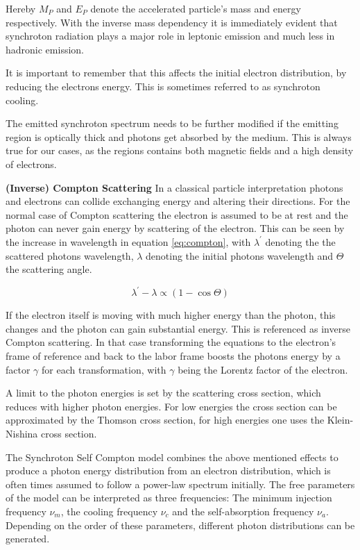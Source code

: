Hereby $M_P$ and $E_P$ denote the accelerated particle's 
mass and energy respectively. With the inverse mass dependency 
it is immediately evident that 
synchroton radiation plays a major role in leptonic 
emission and much less in hadronic emission.

It is important to remember that this affects the 
initial electron distribution, by reducing the electrons energy.
This is sometimes referred to as synchroton cooling.

The emitted synchroton spectrum needs to be further modified 
if the emitting region is optically thick and photons 
get absorbed by the medium.
This is always true for our cases, as the regions contains 
both magnetic fields and a high density of electrons.

\textbf{(Inverse) Compton Scattering}
In a classical particle interpretation photons and electrons 
can collide exchanging energy and altering their directions.
For the normal case of Compton scattering the electron 
is assumed to be at rest and the photon can never gain 
energy by scattering of the electron.
This can be 
seen by the increase in wavelength in equation \ref{eq:compton},
with $\lambda^{\prime}$ denoting the the scattered photons 
wavelength, $\lambda$ denoting the initial photons wavelength  
and $\Theta$ the scattering angle.

\begin{equation}
	\lambda^{\prime} - \lambda  \propto \left(1-\cos{\Theta} \right)
	\label{eq:compton}
\end{equation}


If the electron itself is moving with much higher energy
than the photon, this changes and the photon can gain substantial energy.
This is referenced as inverse Compton scattering.
In that case transforming the equations to the 
electron's frame of reference and back to the labor frame 
boosts the photons energy by a factor $\gamma$ for each transformation, 
with $\gamma$ being the Lorentz factor of the electron.

A limit to the photon energies is set by the scattering cross
section, which reduces with higher photon energies.
For low energies the cross section can be approximated by 
the Thomson cross section, for high energies
one uses the Klein-Nishina cross section.

The Synchroton Self Compton model combines the above mentioned
effects to produce a photon energy distribution from an
electron distribution, which is often times assumed to
follow a power-law spectrum initially.
The free parameters of the model can be interpreted as 
three frequencies: The minimum injection frequency $\nu_m$, 
the cooling frequency $\nu_c$ and the self-absorption frequency $\nu_a$.
Depending on the order of these parameters, different 
photon distributions can be generated.

